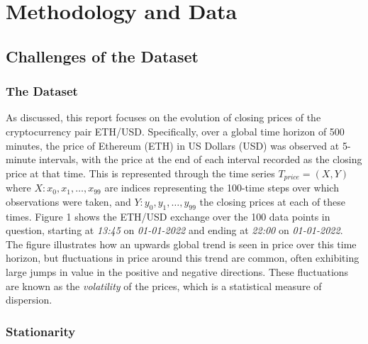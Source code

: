 \documentclass[a4paper, 11pt]{article}
\begin{document}
    \section{Methodology and Data}

    \subsection{Challenges of the Dataset}

    \subsubsection{The Dataset}

    As discussed, this report focuses on the evolution of closing prices of the cryptocurrency pair ETH/USD. Specifically, over a global time horizon of 500 minutes, the price of Ethereum (ETH) in US Dollars (USD) was observed at 5-minute intervals, with the price at the end of each interval recorded as the closing price at that time. This is represented through the time series $T_{price} = \left(X, Y \right)$ where $X \colon x_0, x_1, \ldots, x_{99}$ are indices representing the 100-time steps over which observations were taken, and $Y: y_0, y_1, \ldots, y_{99}$ the closing prices at each of these times. Figure 1 shows the ETH/USD exchange over the 100 data points in question, starting at \emph{13:45} on \emph{01-01-2022} and ending at \emph{22:00} on \emph{01-01-2022}. The figure illustrates how an upwards global trend is seen in price over this time horizon, but fluctuations in price around this trend are common, often exhibiting large jumps in value in the positive and negative directions. These fluctuations are known as the \emph{volatility} of the prices, which is a statistical measure of dispersion.

    \subsubsection{Stationarity}
\end{document}
